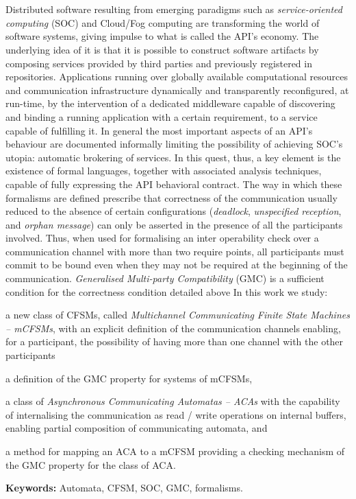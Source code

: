 \chapter*{\runtitle}

Distributed software resulting from emerging paradigms such as \emph{service-oriented computing} (SOC) and Cloud/Fog computing are transforming the world of software systems, giving impulse to what is called the API's economy. The underlying idea of it is that it is possible to construct software artifacts by composing services provided by third parties and previously registered in repositories. Applications running over globally available computational resources and communication infrastructure dynamically and transparently reconfigured, at run-time, by the intervention of a dedicated middleware capable of discovering and binding a running application with a certain requirement, to a service capable of fulfilling it.
In general the most important aspects of an API's behaviour are documented informally limiting the possibility of achieving SOC's utopia: automatic brokering of services. In this quest, thus, a key element is the existence of formal languages, together with associated analysis techniques, capable of fully expressing the API behavioral contract.
The way in which these formalisms are defined prescribe that correctness of the communication usually reduced to the absence of certain configurations (\emph{deadlock}, \emph{unspecified reception}, and \emph{orphan message}) can only be asserted in the presence of all the participants involved. Thus, when used for formalising an inter operability check over a communication channel with more than two require points, all participants must commit to be bound even when they may not be required at the beginning of the communication.
\emph{Generalised Multi-party Compatibility} (GMC) is a sufficient condition for the correctness condition detailed above
In this work we study:
\begin{inparaenum}[1)]
 \item a new class of CFSMs, called \emph{Multichannel Communicating Finite State Machines -- mCFSMs}, with an explicit definition of the communication channels enabling, for a participant, the possibility of having more than one channel with the other participants
 \item a definition of the GMC property for systems of mCFSMs, 
 \item a class of \emph{Asynchronous Communicating Automatas -- ACAs} with the capability of internalising the communication as read / write operations on internal buffers, enabling partial composition of communicating automata, and
 \item a method for mapping an ACA to a mCFSM providing a checking mechanism of the GMC property for the class of ACA.
 \end{inparaenum}


\bigskip

\noindent\textbf{Keywords:} Automata, CFSM, SOC, GMC, formalisms.
